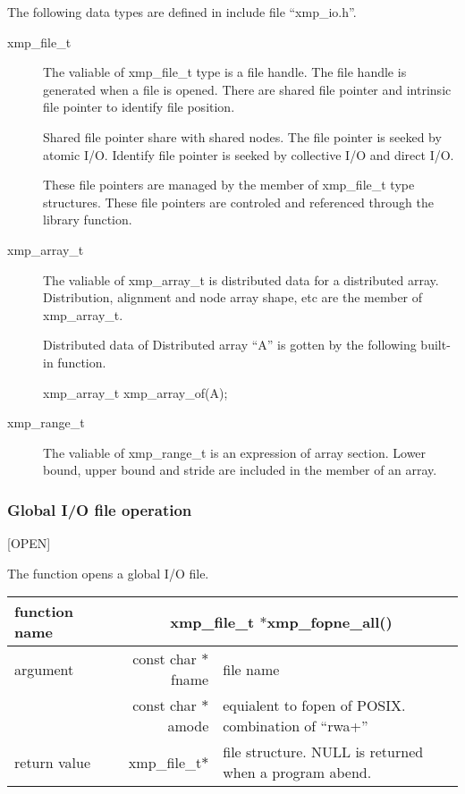    The following data types are defined in include file ``xmp\_io.h''.
   \begin{description}
    \item[xmp\_file\_t] The valiable of xmp\_file\_t type is a file
	       handle.
	       The file handle is generated when a file is opened.
	       There are shared file pointer and intrinsic file pointer
	       to identify file position.

	       Shared file pointer share with shared nodes.
	       The file pointer is seeked by atomic I/O.
	       Identify file pointer is seeked by collective I/O and
	       direct I/O.
	       
	       These file pointers are managed by the member of
	       xmp\_file\_t type structures.
	       These file pointers are controled and referenced through
	       the library function.
	       
    \item[xmp\_array\_t] The valiable of xmp\_array\_t is distributed data
	       for a distributed array.
	       Distribution, alignment and node array shape, etc are the
	       member of xmp\_array\_t.

	       Distributed data of Distributed array ``A'' is gotten by
	       the following built-in function.
	       
	       xmp\_array\_t xmp\_array\_of(A);
	       
    \item[xmp\_range\_t] The valiable of xmp\_range\_t is an expression
	       of array section.
	       Lower bound, upper bound and stride are included in the
	       member of an array.
   \end{description}

   \subsubsection{Global I/O file operation}

   [OPEN]
   
   The function opens a global I/O file.
   \begin{table}[h]
    \begin{center}
      \begin{tabular}{|l|r|p{90mm}|}
      \hline
      {\bf function name}  & \multicolumn{2}{c|}{\bf xmp\_file\_t
      $*$xmp\_fopne\_all()}  \\ \hline
      argument & const char $*$fname & file name \\ \cline{2-3}
      & const char $*$amode & equialent to fopen of POSIX. combination
	      of ``rwa+'' \\ \hline
      return value & xmp\_file\_t$*$ & file structure. NULL is returned
	      when a program abend. \\ \hline
      \end{tabular}
     \end{center}
    \label{tb:aaa}
   \end{table}

